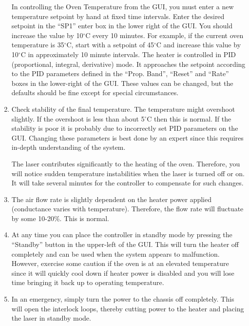 \begin{enumerate}
In controlling the Oven Temperature from the GUI, you must enter a new
temperature setpoint by hand at fixed time intervals.  Enter the desired
setpoint in the ``SP1'' enter box in the lower right of the GUI.  
You should increase the  value by 10$^\circ$C every 10 minutes. 
For example, if the current oven temperature is 35$^\circ$C, start with 
a setpoint of 45$^\circ$C and increase this
value by 10$^\circ$C in approximately 10 minute intervals.
The heater is controlled in PID (proportional, integral, derivative) mode.
It approaches the setpoint according to the PID parameters defined in
the ``Prop. Band'', ``Reset'' and ``Rate'' boxes in the lower-right
of the GUI.  These values can be changed, but the defaults should be 
fine except for special circumstances.
\item Check stability of the final temperature. 
  The temperature might overshoot slightly. If the overshoot is
  less than about 5$^\circ$C then this is normal. If the stability is
  poor it is probably due to incorrectly set PID parameters on the
  GUI.  Changing these parameters is best done by an expert since this 
  requires in-depth understanding of the system.

  The laser contributes significantly to the heating of the oven.
  Therefore, you will notice sudden temperature instabilities when
  the laser is turned off or on. It will take several minutes for
  the controller to compensate for such changes.

\item The air flow rate is slightly dependent on the heater power
  applied (conductance varies with temperature). 
  Therefore, the flow rate will fluctuate by some 10-20\%. This is
  normal.


\item At any time you can place the controller in standby mode by pressing
the ``Standby'' button in the upper-left of the GUI.  
  This will turn the heater off completely and can be used
  when the system appears to malfunction.   However, exercise some
  caution if the oven is at an elevated temperature since it will quickly 
  cool down if heater power is disabled and you will lose time bringing
  it back up to operating temperature.


\item In an emergency, simply turn the power to the chassis off completely.
  This will open the interlock loops, thereby cutting power to the heater
  and placing the laser in standby mode.

\end{enumerate}

